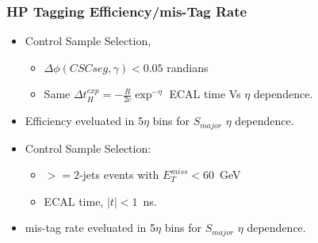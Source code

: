\documentclass{beamer}
\begin{document}
\begin{frame}
\frametitle{HP Tagging Efficiency/mis-Tag Rate}
   \begin{minipage}[t]{\linewidth}
     \begin{tcolorbox}[colback=UNL@Cream!5,colframe=UMN@Maroon!40,title=\textcolor{black}{\textbf{Halo Photon Tagging Efficiency}}]
        \begin{itemize}
         \item Control Sample Selection,
           \begin{itemize}
            \item $\Delta\phi(CSC seg, \gamma) < 0.05$ randians
            \item Same $ \Delta t^{exp}_{H}= -\frac{R}{2c}\exp^{-\eta} $ ECAL time Vs $\eta$ dependence.
           \end{itemize}
         \item Efficiency eveluated in 5$\eta$ bins for $S_{major}$ $\eta$ dependence.
        \end{itemize}
      \end{tcolorbox} 
   \end{minipage}
   \begin{minipage}[t]{\linewidth} 
     \begin{tcolorbox}[colback=UNL@Cream!5,colframe=UMN@Maroon!40,title=\textcolor{black}{\textbf{Halo Photon mis-Tag Rate}}]
      \begin{itemize}
         \item Control Sample Selection:
           \begin{itemize}
            \item $ >= 2$-jets events with $E^{miss}_{T} < 60$~GeV
            \item ECAL time, $|t| < 1$~ns.
           \end{itemize}
          \item mis-tag rate eveluated in 5$\eta$ bins for $S_{major}$ $\eta$ dependence.         
        \end{itemize}
      \end{tcolorbox}
  \end{minipage}
\end{frame}
\end{document}
